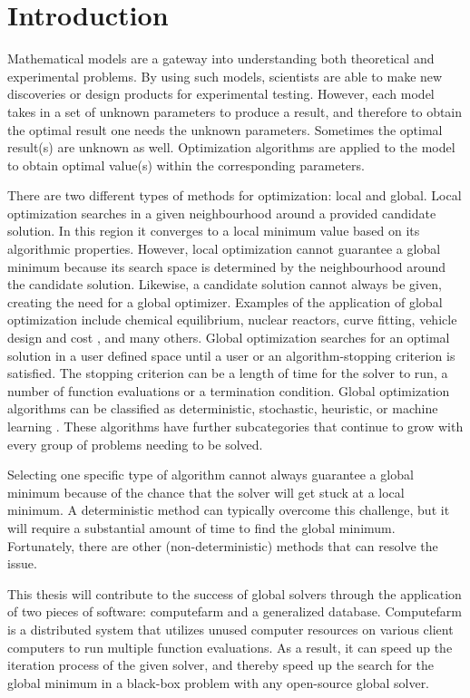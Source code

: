 
\chapter{Introduction}
\label{introduction}

Mathematical models are a gateway into understanding both theoretical and experimental problems. By using such models, scientists are able to make new discoveries or design products for experimental testing. However, each model takes in a set of unknown parameters to produce a result, and therefore to obtain the optimal result one needs the unknown parameters. Sometimes the optimal result(s) are unknown as well. Optimization algorithms are applied to the model to obtain optimal value(s) within the corresponding parameters.  

There are two different types of methods for optimization: local and global. Local optimization searches in a given neighbourhood around a provided candidate solution. In this region it converges to a local minimum value based on its algorithmic properties. However, local optimization cannot guarantee a global minimum because its search space is determined by the neighbourhood around the candidate solution. Likewise, a candidate solution cannot always be given, creating the need for a global optimizer.  Examples of the application of global optimization include chemical equilibrium, nuclear reactors, curve fitting, vehicle design and cost \cite{Pinter2002}, and many others.
Global optimization searches for an optimal solution in a user defined space until a user or an algorithm-stopping criterion is satisfied. The stopping criterion can be a length of time for the solver to run, a number of function evaluations or a termination condition. Global optimization algorithms can be classified as deterministic, stochastic, heuristic, or machine learning \cite{Pinter2002}. These algorithms have further subcategories that continue to grow with every group of problems needing to be solved. 

Selecting one specific type of algorithm cannot always guarantee a global minimum because of the chance that the solver will get stuck at a local minimum. A deterministic method can typically overcome this challenge, but it will require a substantial amount of time to find the global minimum. Fortunately, there are other (non-deterministic) methods that can resolve the issue. 

This thesis will contribute to the success of global solvers through the application of two pieces of software: computefarm and a generalized database. Computefarm is a distributed system that utilizes unused computer resources on various client computers to run multiple function evaluations. As a result, it can speed up the iteration process of the given solver, and thereby speed up the search for the global minimum in a black-box problem with any open-source global solver. 

